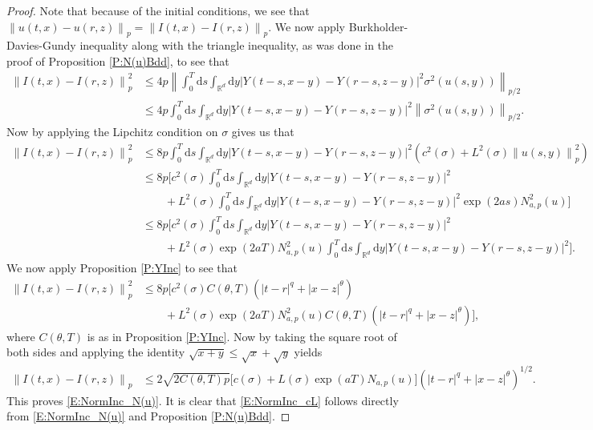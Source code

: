 \documentclass[a4paper,11pt]{article}
\numberwithin{equation}{section}
\theoremstyle{plain}
\theoremstyle{definition}
\newcommand{\ud}{\ensuremath{\mathrm{d} }}
\newcommand{\Norm}[1]{\left\|  #1   \right\|}
\newcommand{\R}{\mathbb{R}}
\numberwithin{NQ}{section}
\numberwithin{LQ}{section}
\numberwithin{ZQ}{section}
\begin{document}
	\begin{proof}
		Note that because of the initial conditions, we see that $\Norm{u(t,x) - u(r,z)}_p = \Norm{I(t,x) - I(r,z)}_p$. We now apply Burkholder-Davies-Gundy inequality along with the triangle inequality, as was done in the proof of Proposition \ref{P:N(u)Bdd},  to see that
		\begin{align*}
		\Norm{I(t,x) - I(r,z)}_p^2 &\le 4p \Norm{ \int_0^T \ud s \int_{\R^d} \ud y \left| Y(t-s,x-y) - Y(r-s,z-y) \right|^2\sigma^2(u(s,y)) }_{p/2} \\
		&\le 4p \int_0^T \ud s \int_{\R^d} \ud y \left| Y(t-s,x-y) - Y(r-s,z-y) \right|^2  \Norm{\sigma^2(u(s,y)) }_{p/2}.
		\end{align*} 
		Now by applying the Lipchitz condition on $\sigma$ gives us that 
		\begin{align*}
		\Norm{I(t,x) - I(r,z)}_p^2 &\le 8p \int_0^T \ud s \int_{\R^d} \ud y \left| Y(t-s,x-y) - Y(r-s,z-y) \right|^2 \left( c^2(\sigma) + L^2(\sigma)\Norm{u(s,y)}_{p}^2\right) \\
		&\le 8p\Bigg[ c^2(\sigma)   \int_0^T \ud s \int_{\R^d} \ud y \left| Y(t-s,x-y) - Y(r-s,z-y) \right|^2 \\
		& \qquad+ L^2(\sigma) \int_0^T \ud s \int_{\R^d} \ud y \left| Y(t-s,x-y) - Y(r-s,z-y) \right|^2 \exp\left(2as\right)N_{a,p}^2(u)  \Bigg] \\
		&\le 8p\Bigg[ c^2(\sigma)   \int_0^T \ud s \int_{\R^d} \ud y \left| Y(t-s,x-y) - Y(r-s,z-y) \right|^2 \\
		& \qquad+ L^2(\sigma) \exp\left(2aT \right)N_{a,p}^2(u)  \int_0^T \ud s \int_{\R^d} \ud y \left| Y(t-s,x-y) - Y(r-s,z-y) \right|^2  \Bigg]. 
		\end{align*}
		We now apply Proposition \ref{P:YInc} to see that 
		\begin{align*}
		\Norm{I(t,x) - I(r,z)}_p^2 &\le 8p \bigg[ c^2(\sigma)C(\theta, T)\left(|t-r|^{q} + |x-z|^{\theta}\right)\\ 
		& \qquad +  L^2(\sigma) \exp\left(2aT \right)N_{a,p}^2(u) C(\theta, T)\left(|t-r|^{q} + |x-z|^{\theta}\right) \bigg],
		\end{align*}
		where $C(\theta, T)$ is as in Proposition \ref{P:YInc}. Now by taking the square root of both sides and applying the identity $\sqrt{x+y} \le \sqrt{x} + \sqrt{y}$ yields
		\begin{align*}
		\Norm{I(t,x) - I(r,z)}_p &\le 2\sqrt{2C(\theta, T)p} \Big[ c(\sigma) + L(\sigma) \exp\left(aT \right)N_{a,p}(u) \Big]\left(|t-r|^{q} + |x-z|^{\theta}\right)^{1/2}. 
		\end{align*}
		This proves \eqref{E:NormInc_N(u)}. It is clear that \eqref{E:NormInc_cL} follows directly from \eqref{E:NormInc_N(u)} and Proposition \ref{P:N(u)Bdd}. 
	\end{proof}
	
\end{document}
